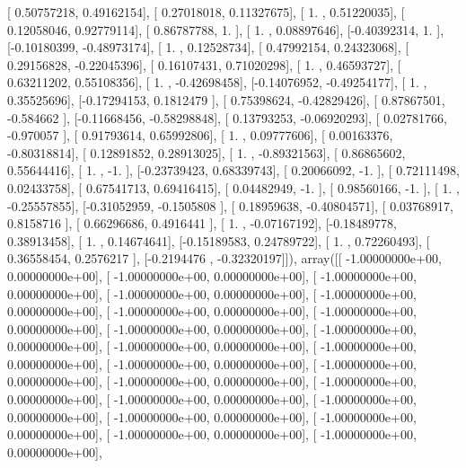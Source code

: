 \documentclass{article}
\begin{document}
       [ 0.50757218,  0.49162154],
       [ 0.27018018,  0.11327675],
       [ 1.        ,  0.51220035],
       [ 0.12058046,  0.92779114],
       [ 0.86787788,  1.        ],
       [ 1.        ,  0.08897646],
       [-0.40392314,  1.        ],
       [-0.10180399, -0.48973174],
       [ 1.        ,  0.12528734],
       [ 0.47992154,  0.24323068],
       [ 0.29156828, -0.22045396],
       [ 0.16107431,  0.71020298],
       [ 1.        ,  0.46593727],
       [ 0.63211202,  0.55108356],
       [ 1.        , -0.42698458],
       [-0.14076952, -0.49254177],
       [ 1.        ,  0.35525696],
       [-0.17294153,  0.1812479 ],
       [ 0.75398624, -0.42829426],
       [ 0.87867501, -0.584662  ],
       [-0.11668456, -0.58298848],
       [ 0.13793253, -0.06920293],
       [ 0.02781766, -0.970057  ],
       [ 0.91793614,  0.65992806],
       [ 1.        ,  0.09777606],
       [ 0.00163376, -0.80318814],
       [ 0.12891852,  0.28913025],
       [ 1.        , -0.89321563],
       [ 0.86865602,  0.55644416],
       [ 1.        , -1.        ],
       [-0.23739423,  0.68339743],
       [ 0.20066092, -1.        ],
       [ 0.72111498,  0.02433758],
       [ 0.67541713,  0.69416415],
       [ 0.04482949, -1.        ],
       [ 0.98560166, -1.        ],
       [ 1.        , -0.25557855],
       [-0.31052959, -0.1505808 ],
       [ 0.18959638, -0.40804571],
       [ 0.03768917,  0.8158716 ],
       [ 0.66296686,  0.4916441 ],
       [ 1.        , -0.07167192],
       [-0.18489778,  0.38913458],
       [ 1.        ,  0.14674641],
       [-0.15189583,  0.24789722],
       [ 1.        ,  0.72260493],
       [ 0.36558454,  0.2576217 ],
       [-0.2194476 , -0.32320197]]), array([[ -1.00000000e+00,   0.00000000e+00],
       [ -1.00000000e+00,   0.00000000e+00],
       [ -1.00000000e+00,   0.00000000e+00],
       [ -1.00000000e+00,   0.00000000e+00],
       [ -1.00000000e+00,   0.00000000e+00],
       [ -1.00000000e+00,   0.00000000e+00],
       [ -1.00000000e+00,   0.00000000e+00],
       [ -1.00000000e+00,   0.00000000e+00],
       [ -1.00000000e+00,   0.00000000e+00],
       [ -1.00000000e+00,   0.00000000e+00],
       [ -1.00000000e+00,   0.00000000e+00],
       [ -1.00000000e+00,   0.00000000e+00],
       [ -1.00000000e+00,   0.00000000e+00],
       [ -1.00000000e+00,   0.00000000e+00],
       [ -1.00000000e+00,   0.00000000e+00],
       [ -1.00000000e+00,   0.00000000e+00],
       [ -1.00000000e+00,   0.00000000e+00],
       [ -1.00000000e+00,   0.00000000e+00],
       [ -1.00000000e+00,   0.00000000e+00],
       [ -1.00000000e+00,   0.00000000e+00],
       [ -1.00000000e+00,   0.00000000e+00],
\end{document}
